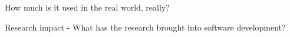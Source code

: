 \documentclass{sigchi}
\begin{document}
How much is it used in the real world, really?

Research impact
- What has the research brought into software development?

\nocite{*} %

%
%
%
%
%
\balance



\end{document}
